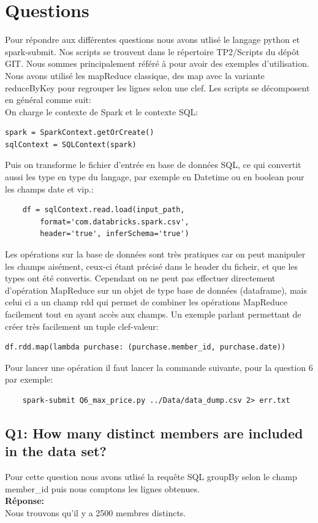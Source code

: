 \documentclass[11pt]{article}
\begin{document}
\section{Questions}
Pour répondre aux différentes questions nous avons utlisé le langage python et
spark-submit. Nos scripts se trouvent dans le répertoire TP2/Scripts du dépôt
GIT. Nous sommes principalement référé à \cite{SparkDoc} pour avoir des
exemples d'utilisation. Nous avons utilisé les mapReduce classique, des map
avec la variante reduceByKey pour regrouper les lignes selon une clef. 
Les scripts se décomposent en général comme suit: \\
On charge le contexte de Spark et le contexte SQL:
\begin{verbatim}
spark = SparkContext.getOrCreate()
sqlContext = SQLContext(spark)
\end{verbatim}
Puis on transforme le fichier d'entrée en base de données SQL, ce qui
convertit aussi les type en type du langage, par exemple en Datetime
ou en boolean pour les champs date et vip.:
\begin{verbatim}
	df = sqlContext.read.load(input_path,
		format='com.databricks.spark.csv',
		header='true', inferSchema='true')
\end{verbatim}

Les opérations sur la base de données sont très pratiques car on peut
manipuler les champs aisément, ceux-ci étant précisé dans le header du 
ficheir, et que les types ont été convertis.
Cependant on ne peut pas effectuer directement d'opération MapReduce sur
un objet de type base de données (dataframe), mais celui ci a un champ
rdd qui permet de combiner les opérations MapReduce facilement tout en 
ayant accès aux champs. Un exemple parlant permettant de créer très
facilement un tuple clef-valeur:
\begin{verbatim}
df.rdd.map(lambda purchase: (purchase.member_id, purchase.date))
\end{verbatim}

Pour lancer une opération il faut lancer la commande suivante, pour la
question 6 par exemple:
\begin{center}
\begin{verbatim}
	spark-submit Q6_max_price.py ../Data/data_dump.csv 2> err.txt
\end{verbatim}
\end{center}

\subsection*{Q1: How many distinct members are included in the data set?}
	Pour cette question nous avons utlisé la requête SQL groupBy selon
	le champ member\_id puis nous comptons les lignes obtenues.\\
	\textbf{Réponse:\\}
	Nous trouvons qu'il y a 2500 membres distincts.
\end{document}
